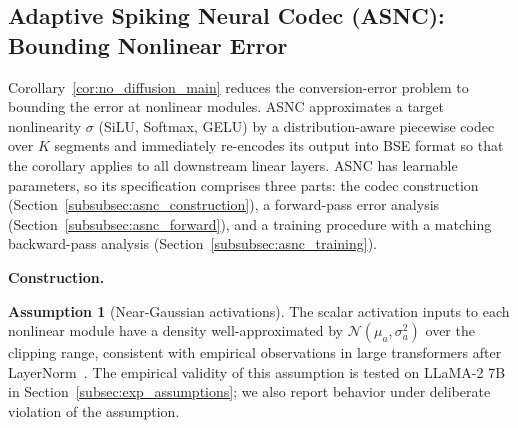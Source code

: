 \documentclass{article}
\theoremstyle{plain}
\theoremstyle{definition}
\newtheorem{assumption}[theorem]{Assumption}
\theoremstyle{remark}
\begin{document}
\subsection{Adaptive Spiking Neural Codec (ASNC): Bounding Nonlinear Error}
\label{subsec:asnc}

Corollary~\ref{cor:no_diffusion_main} reduces the conversion-error problem
to bounding the error at nonlinear modules. ASNC approximates a target
nonlinearity $\sigma$ (SiLU, Softmax, GELU) by a distribution-aware
piecewise codec over $K$ segments and immediately re-encodes its output into
BSE format so that the corollary applies to all downstream linear layers.
ASNC has learnable parameters, so its specification comprises three parts:
the codec construction (Section~\ref{subsubsec:asnc_construction}), a
forward-pass error analysis (Section~\ref{subsubsec:asnc_forward}), and a
training procedure with a matching backward-pass analysis
(Section~\ref{subsubsec:asnc_training}).

\noindent\textbf{Construction.}
\label{subsubsec:asnc_construction}

\begin{assumption}[Near-Gaussian activations]
\label{asm:gaussian_activations}
The scalar activation inputs to each nonlinear module have a density
well-approximated by $\mathcal{N}(\mu_a,\sigma_a^2)$ over the clipping range,
consistent with empirical observations in large transformers after
LayerNorm~\citep{he2024understanding,lin2024duquant}. The empirical validity
of this assumption is tested on LLaMA-2 7B in
Section~\ref{subsec:exp_assumptions}; we also report behavior under
deliberate violation of the assumption.
\end{assumption}
\end{document}
